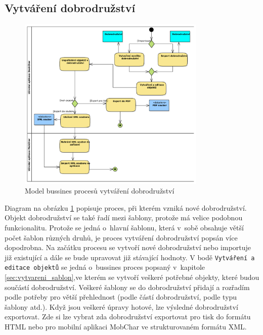 \documentclass[thesis=B,czech]{resources/FITthesis}[2012/06/26]
\begin{document}
\subsection{Vytváření dobrodružství}
\begin{figure}\centering
	\includegraphics[width=0.8\textwidth]{images/business_dobrodruzstvi}
	\caption[Business proces vytváření dobrodružství]{Model bussines procesů vytváření dobrodružství}\label{fig:bp_dobrodruzsvi}
\end{figure}
Diagram na obrázku \ref{fig:bp_dobrodruzsvi} popisuje proces, při kterém vzniká nové dobrodružství. Objekt dobrodružství se také řadí mezi šablony, protože má velice podobnou funkcionalitu. Protože se jedná o~hlavní šablonu, která v~sobě obsahuje větší počet šablon různých druhů, je proces vytváření dobrodružství popsán více dopodrobna. Na začátku procesu se vytvoří nové dobrodružství nebo importuje již existující a dále se bude upravovat již stávající hodnoty. V bodě \texttt{Vytváření a editace objektů} se jedná o~bussines proces popsaný v~kapitole \ref{sec:vytvareni_sablon},ve kterém se vytvoří veškeré potřebné objekty, které budou součástí dobrodružství. Veškeré šablony se do dobrodružství přidají a rozřadím podle potřeby pro větší přehlednost (podle částí dobrodružství, podle typu šablony atd.). Když jsou veškeré úpravy hotové, lze výsledné dobrodružství exportovat. Zde si lze vybrat zda dobrodružství exportovat pro tisk do formátu HTML nebo pro mobilní aplikaci MobChar ve strukturovaném formátu XML.
\end{document}
